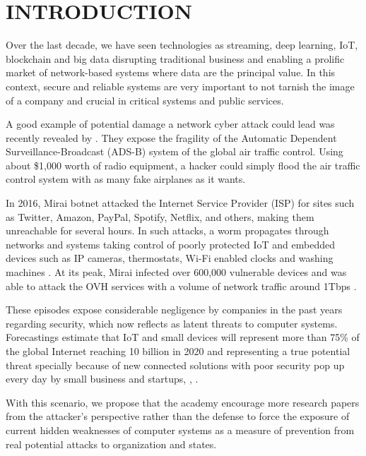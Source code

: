 \documentclass[a4paper,twoside]{article}
\begin{document}
\onecolumn \maketitle \normalsize \setcounter{footnote}{0} \vfill

\section{\uppercase{Introduction}}

\noindent Over the last decade, we have seen technologies as streaming, deep learning, IoT, blockchain and big data disrupting traditional business and enabling a prolific market of network-based systems where data are the principal value. In this context, secure and reliable systems are very important to not tarnish the image of a company and crucial in critical systems and public services.

A good example of potential damage a network cyber attack could lead was recently revealed by \cite{McCallie:2011}. They expose the fragility of the Automatic Dependent Surveillance-Broadcast (ADS-B) system of the global air traffic control. Using about \$1,000 worth of radio equipment, a hacker could simply flood the air traffic control system with as many fake airplanes as it wants.

In 2016, Mirai botnet attacked the Internet Service Provider (ISP) for sites such as Twitter, Amazon, PayPal, Spotify, Netflix, and others, making them unreachable for several hours. In such attacks, a worm propagates through networks and systems taking control of poorly protected IoT and embedded devices such as IP cameras, thermostats, Wi-Fi enabled clocks and washing machines \cite{Kolias:2017}. At its peak, Mirai infected over 600,000 vulnerable devices and was able to attack the OVH services with a volume of network traffic around 1Tbps \cite{Antonakakis:2017}.

These episodes expose considerable negligence by companies in the past years regarding security, which now reflects as latent threats to computer systems. Forecastings estimate that IoT and small devices will represent more than 75\% of the global Internet reaching 10 billion in 2020 and representing a true potential threat specially because of new connected solutions with poor security pop up every day by small business and startups, \cite{Rose:2015}, \cite{Columbus:2018}.

With this scenario, we propose that the academy encourage more research papers from the attacker's perspective rather than the defense to force the exposure of current hidden weaknesses of computer systems as a measure of prevention from real potential attacks to organization and states.
\end{document}
